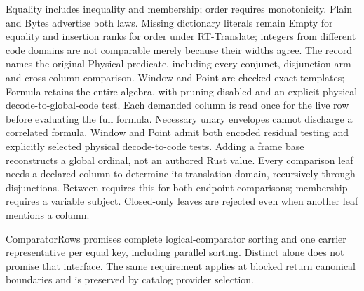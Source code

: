 \begin{mathpar}
\end{mathpar}
Equality includes inequality and membership; order requires monotonicity.
Plain and Bytes advertise both laws. Missing dictionary literals remain Empty
for equality and insertion ranks for order under RT-Translate; integers from
different code domains are not comparable merely because their widths agree.
The record names the original Physical predicate, including every conjunct,
disjunction arm and cross-column comparison. Window and Point are checked
exact templates; Formula retains the entire algebra, with pruning disabled
and an explicit physical decode-to-global-code test. Each demanded column is
read once for the live row before evaluating the full formula. Necessary unary
envelopes cannot discharge a correlated formula. Window and Point admit both
encoded residual testing and explicitly selected physical decode-to-code tests.
Adding a frame base reconstructs a global ordinal, not an authored Rust value.
Every comparison leaf needs a declared column to determine its translation
domain, recursively through disjunctions. Between requires this for both
endpoint comparisons; membership requires a variable subject. Closed-only
leaves are rejected even when another leaf mentions a column.

\begin{mathpar}
\end{mathpar}
ComparatorRows promises complete logical-comparator sorting and one carrier
representative per equal key, including parallel sorting. Distinct alone does
not promise that interface. The same requirement applies at blocked return
canonical boundaries and is preserved by catalog provider selection.

